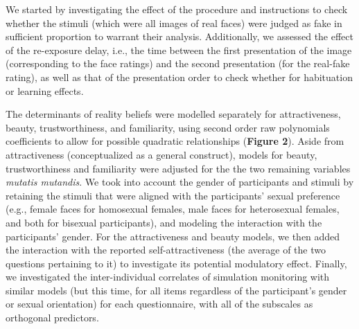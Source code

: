 \documentclass[
  man,floatsintext]{apa6}
\begin{document}
We started by investigating the effect of the procedure and instructions to check whether the stimuli (which were all images of real faces) were judged as fake in sufficient proportion to warrant their analysis. Additionally, we assessed the effect of the re-exposure delay, i.e., the time between the first presentation of the image (corresponding to the face ratings) and the second presentation (for the real-fake rating), as well as that of the presentation order to check whether for habituation or learning effects.

The determinants of reality beliefs were modelled separately for attractiveness, beauty, trustworthiness, and familiarity, using second order raw polynomials coefficients to allow for possible quadratic relationships (\textbf{Figure 2}). Aside from attractiveness (conceptualized as a general construct), models for beauty, trustworthiness and familiarity were adjusted for the the two remaining variables \emph{mutatis mutandis}. We took into account the gender of participants and stimuli by retaining the stimuli that were aligned with the participants' sexual preference (e.g., female faces for homosexual females, male faces for heterosexual females, and both for bisexual participants), and modeling the interaction with the participants' gender. For the attractiveness and beauty models, we then added the interaction with the reported self-attractiveness (the average of the two questions pertaining to it) to investigate its potential modulatory effect. Finally, we investigated the inter-individual correlates of simulation monitoring with similar models (but this time, for all items regardless of the participant's gender or sexual orientation) for each questionnaire, with all of the subscales as orthogonal predictors.
\end{document}
